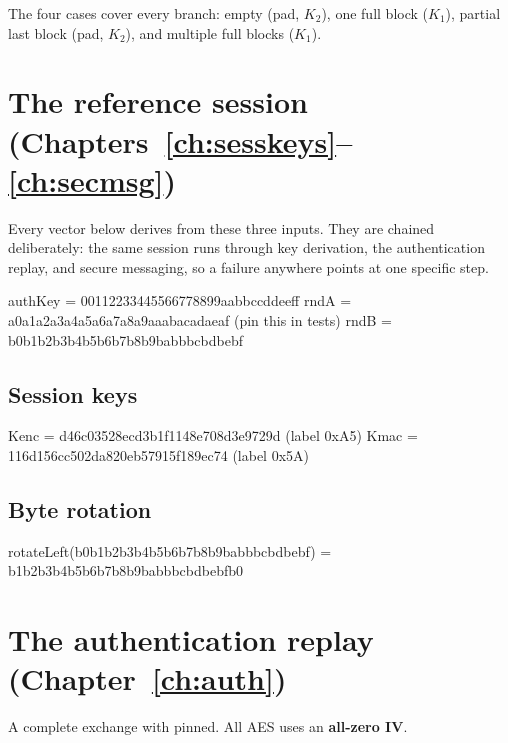 The four cases cover every branch: empty (pad, $K_2$), one full block ($K_1$),
partial last block (pad, $K_2$), and multiple full blocks ($K_1$).

\section{The reference session (Chapters~\ref{ch:sesskeys}--\ref{ch:secmsg})}

Every vector below derives from these three inputs. They are chained
deliberately: the same session runs through key derivation, the authentication
replay, and secure messaging, so a failure anywhere points at one specific step.

\begin{trace}
authKey = 00112233445566778899aabbccddeeff
rndA    = a0a1a2a3a4a5a6a7a8a9aaabacadaeaf     (pin this in tests)
rndB    = b0b1b2b3b4b5b6b7b8b9babbbcbdbebf
\end{trace}

\subsection{Session keys}

\begin{trace}
Kenc = d46c03528ecd3b1f1148e708d3e9729d      (label 0xA5)
Kmac = 116d156cc502da820eb57915f189ec74      (label 0x5A)
\end{trace}

\subsection{Byte rotation}

\begin{trace}
rotateLeft(b0b1b2b3b4b5b6b7b8b9babbbcbdbebf)
         = b1b2b3b4b5b6b7b8b9babbbcbdbebfb0
\end{trace}

\section{The authentication replay (Chapter~\ref{ch:auth})}

A complete  exchange with  pinned. All AES
uses an \textbf{all-zero IV}.

